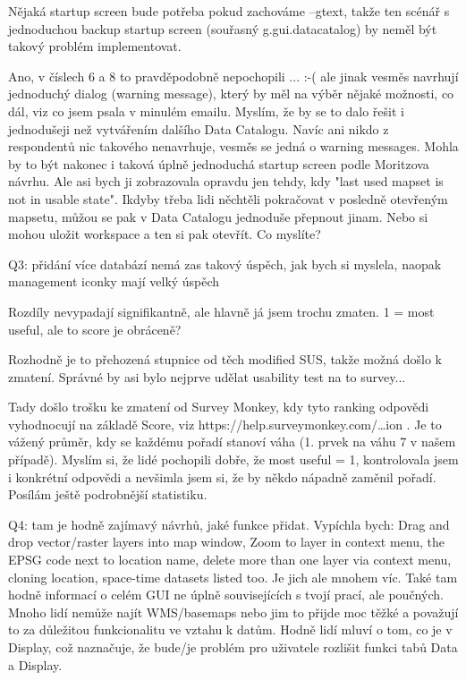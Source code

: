 \documentclass[a4paper,10pt,twoside]{article}
\begin{document}
Nějaká startup screen bude potřeba pokud zachováme --gtext, takže ten scénář s jednoduchou backup startup screen (souřasný g.gui.datacatalog) by neměl být takový problém implementovat.

Ano, v číslech 6 a 8 to pravděpodobně nepochopili ... :-( ale jinak vesměs navrhují jednoduchý dialog (warning message), který by měl na výběr nějaké možnosti, co dál, viz co jsem psala v minulém emailu. Myslím, že by se to dalo řešit i jednodušeji než vytvářením dalšího Data Catalogu. Navíc ani nikdo z respondentů nic takového nenavrhuje, vesměs se jedná o warning messages. Mohla by to být nakonec i taková úplně jednoduchá startup screen podle Moritzova návrhu. Ale asi bych ji zobrazovala opravdu jen tehdy, kdy "last used mapset is not in usable state". Ikdyby třeba lidi něchtěli pokračovat v posledně otevřeným mapsetu, můžou se pak v Data Catalogu jednoduše přepnout jinam. Nebo si mohou uložit workspace a ten si pak otevřít. Co myslíte?


    Q3: přidání více databází nemá zas takový úspěch, jak bych si myslela, naopak management iconky mají velký úspěch
    
    Rozdíly nevypadají signifikantně, ale hlavně já jsem trochu zmaten. 1 = most useful, ale to score je obráceně?

Rozhodně je to přehozená stupnice od těch modified SUS, takže možná došlo k zmatení. Správné by asi bylo nejprve udělat usability test na to survey...

 Tady došlo trošku ke zmatení od Survey Monkey, kdy tyto ranking odpovědi vyhodnocují na základě Score, viz https://help.surveymonkey.com/…ion . Je to vážený průměr, kdy se každému pořadí stanoví váha (1. prvek na váhu 7 v našem případě). Myslím si, že lidé pochopili dobře, že most useful = 1, kontrolovala jsem i konkrétní odpovědi a nevšimla jsem si, že by někdo nápadně zaměnil pořadí. Posílám ještě podrobnější statistiku.


    Q4: tam je hodně zajímavý návrhů, jaké funkce přidat. Vypíchla bych: Drag and drop vector/raster layers into map window, Zoom to layer in context menu,  the EPSG code next to location name, delete more than one layer via context menu, cloning location, space-time datasets listed too. Je jich ale mnohem víc.
    Také tam hodně informací o celém GUI ne úplně souvisejících s tvojí prací, ale poučných. Mnoho lidí nemůže najít WMS/basemaps nebo jim to přijde moc těžké a považují to za důležitou funkcionalitu ve vztahu k datům. Hodně lidí mluví o tom, co je v Display, což naznačuje, že bude/je problém pro uživatele rozlišit funkci tabů Data a Display.
  
\end{document}
